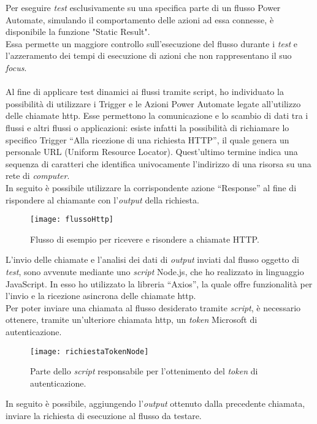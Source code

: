 \noindent Per eseguire \emph{test} esclusivamente su una specifica parte di un flusso Power Automate, simulando il comportamento delle azioni ad essa connesse, è disponibile la funzione "Static Result".\\
Essa permette un maggiore controllo sull'esecuzione del flusso durante i \emph{test} e l'azzeramento dei tempi di esecuzione di azioni che non rappresentano il suo \emph{focus}.\\\\
Al fine di applicare test dinamici ai flussi tramite script, ho individuato la possibilità di utilizzare i Trigger e le Azioni Power Automate legate all'utilizzo delle chiamate \gls{http}.
Esse permettono la comunicazione e lo scambio di dati tra i flussi e altri flussi o applicazioni: esiste infatti la possibilità di richiamare lo specifico Trigger “Alla ricezione di una richiesta HTTP”, il quale genera un personale URL (Uniform Resource Locator).
Quest'ultimo termine indica una sequenza di caratteri che identifica univocamente l'indirizzo di una risorsa su una rete di \emph{computer}.\\
In seguito è possibile utilizzare la corrispondente azione “Response” al fine di rispondere al chiamante con l'\emph{output} della richiesta.\\
\begin{figure}[htbp] 
    \centering 
    \texttt{[image: flussoHttp]} 
    \caption{Flusso di esempio per ricevere e risondere a chiamate HTTP.}
    \label{fig:flussoHttp}
\end{figure}
\newpage \noindent L'invio delle chiamate e l'analisi dei dati di \emph{output} inviati dal flusso oggetto di \emph{test}, sono avvenute mediante uno \emph{script} Node.js, che ho realizzato in linguaggio JavaScript.
In esso ho utilizzato la libreria “Axios”, la quale offre funzionalità per l'invio e la ricezione asincrona delle chiamate \gls{http}.\\
Per poter inviare una chiamata al flusso desiderato tramite \emph{script}, è necessario ottenere, tramite un'ulteriore chiamata \gls{http}, un \emph{token} Microsoft di autenticazione.
\begin{figure}[htbp] 
    \centering 
    \texttt{[image: richiestaTokenNode]} 
    \caption{Parte dello \emph{script} responsabile per l'ottenimento del \emph{token} di autenticazione.}
    \label{fig:richiestaTokenNode}
\end{figure}
\newline In seguito è possibile, aggiungendo l'\emph{output} ottenuto dalla precedente chiamata, inviare la richiesta di esecuzione al flusso da testare.\\
